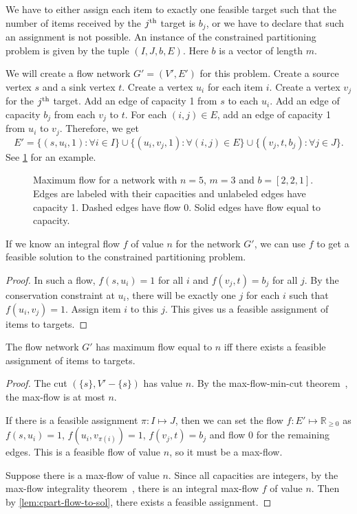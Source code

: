 We have to either assign each item to exactly one feasible target such that the
number of items received by the $j^{\textrm{th}}$ target is $b_j$, or we have to declare
that such an assignment is not possible.
An instance of the constrained partitioning problem is given by the tuple $(I, J, b, E)$.
Here $b$ is a vector of length $m$.

We will create a flow network $G' = (V', E')$ for this problem.
Create a source vertex $s$ and a sink vertex $t$. Create a vertex $u_i$ for each item $i$.
Create a vertex $v_j$ for the $j^{\textrm{th}}$ target.
Add an edge of capacity 1 from $s$ to each $u_i$.
Add an edge of capacity $b_j$ from each $v_j$ to $t$.
For each $(i, j) \in E$, add an edge of capacity 1 from $u_i$ to $v_j$.
Therefore, we get
\[ E' = \{(s, u_i, 1): \forall i \in I\}
\cup \{(u_i, v_j, 1): \forall (i, j) \in E\}
\cup \{(v_j, t, b_j): \forall j \in J\}. \]
See \cref{fig:cpart-flow} for an example.

\begin{figure}[htb]
\centering

\caption[Maximum flow network for the constrained partitioning problem]%
{Maximum flow for a network with $n=5$, $m=3$ and $b=[2,2,1]$.
Edges are labeled with their capacities and unlabeled edges have capacity 1.
Dashed edges have flow 0. Solid edges have flow equal to capacity.}
\label{fig:cpart-flow}
\end{figure}

\begin{lemma}
\label{lem:cpart-flow-to-sol}
If we know an integral flow $f$ of value $n$ for the network $G'$,
we can use $f$ to get a feasible solution to the constrained partitioning problem.
\end{lemma}
\begin{proof}
In such a flow, $f(s, u_i) = 1$ for all $i$ and $f(v_j, t) = b_j$ for all $j$.
By the conservation constraint at $u_i$, there will be exactly one $j$ for each $i$
such that $f(u_i, v_j) = 1$. Assign item $i$ to this $j$.
This gives us a feasible assignment of items to targets.
\end{proof}

\begin{lemma}
\label{lem:cpart-flow-iff}
The flow network $G'$ has maximum flow equal to $n$ iff there exists a feasible
assignment of items to targets.
\end{lemma}
\begin{proof}
The cut $(\{s\}, V'-\{s\})$ has value $n$.
By the max-flow-min-cut theorem~\cite[Theorem 26.6]{clrs:max-flow}, the max-flow is at most $n$.

If there is a feasible assignment $\pi: I \mapsto J$, then we can set the flow
$f: E' \mapsto \mathbb{R}_{\ge 0}$ as $f(s, u_i) = 1$,
$f(u_i, v_{\pi(i)}) = 1$, $f(v_j, t) = b_j$ and flow 0 for the remaining edges.
This is a feasible flow of value $n$, so it must be a max-flow.

Suppose there is a max-flow of value $n$. Since all capacities are integers,
by the max-flow integrality theorem~\cite[Theorem 26.10]{clrs:max-flow},
there is an integral max-flow $f$ of value $n$.
Then by \cref{lem:cpart-flow-to-sol}, there exists a feasible assignment.
\end{proof}

